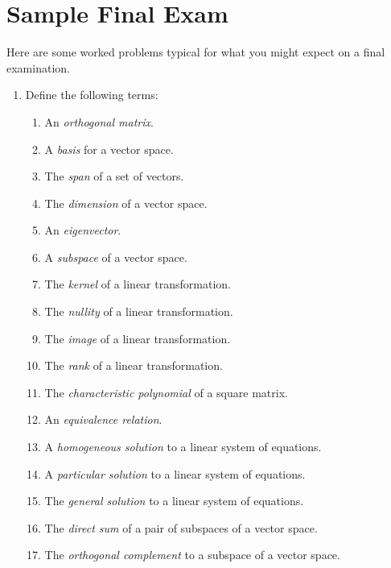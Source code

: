 \chapter{Sample Final Exam}

\label{sample3}

Here are some worked problems typical for what you might expect on a final examination.

\begin{enumerate}

\item Define the following terms:
\begin{enumerate}
\item An {\itshape orthogonal matrix}.
\item A {\itshape basis} for a vector space.
\item The {\itshape span} of a set of vectors.
\item The {\itshape dimension} of a vector space.
\item An {\itshape eigenvector}.
\item A {\itshape subspace} of a vector space.
\item The {\itshape kernel} of a linear transformation.
\item The {\itshape nullity} of a linear transformation.
\item The {\itshape image} of a linear transformation.
\item The {\itshape rank} of a linear transformation.
\item The {\itshape characteristic polynomial} of a square matrix.
\item An {\itshape equivalence relation}.
\item A {\itshape homogeneous solution} to a linear system of equations.
\item A {\itshape particular solution} to a linear system of equations.
\item The {\itshape general solution} to a linear system of equations.
\item The {\itshape direct sum} of a pair of subspaces of a vector space.
\item The {\itshape orthogonal complement} to a subspace of a vector space.
\end{enumerate}





\end{enumerate}
